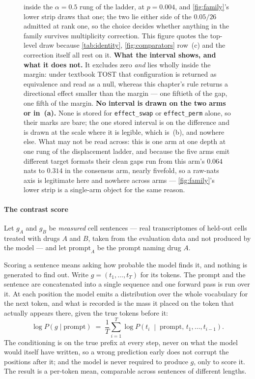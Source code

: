 \begin{figure}[htbp]
\begin{fullwidth}
{inside the $\alpha = 0.5$ rung of the ladder, at $p = 0.004$, and
\cref{fig:family}'s lower strip draws that one; the two lie either side of the
$0.05/26$ admitted at rank one, so the choice decides whether anything in the
family survives multiplicity correction. This figure quotes the top-level draw
because \cref{tab:identity}, \cref{fig:comparators} row~(c) and the correction
itself all rest on it. \textbf{What the interval shows, and what it does not.}
It excludes zero \emph{and} lies wholly inside the margin: under textbook TOST
that configuration is returned as equivalence and read as a null, whereas this
chapter's rule returns a directional effect smaller than the margin --- one
fiftieth of the gap, one fifth of the margin. \textbf{No interval is drawn on
the two arms or in~(a).} None is stored for \texttt{effect\_swap} or
\texttt{effect\_perm} alone, so their marks are bare; the one stored interval
is on the difference and is drawn at the scale where it is legible, which
is~(b), and nowhere else. What may not be read across: this is one arm at one
depth at one rung of the displacement ladder, and because the five arms emit
different target formats their clean gaps run from this arm's $0.064$ nats to
$0.314$ in the consensus arm, nearly fivefold, so a raw-nats axis is legitimate
here and nowhere across arms --- \cref{fig:family}'s lower strip is a
single-arm object for the same reason.}
\label{fig:materiality}
\end{fullwidth}
\end{figure}

\paragraph{The contrast score} Let $g_A$ and $g_B$ be \emph{measured} cell
sentences --- real transcriptomes of held-out cells treated with drugs $A$ and
$B$, taken from the evaluation data and not produced by the model --- and let
$\textrm{prompt}_A$ be the prompt naming drug $A$.

Scoring a sentence means asking how probable the model finds it, and nothing is
generated to find out. Write $g = (t_1, \ldots, t_T)$ for its tokens. The prompt
and the sentence are concatenated into a single sequence and one forward pass is
run over it. At each position the model emits a distribution over the whole
vocabulary for the next token, and what is recorded is the mass it placed on the
token that actually appears there, given the true tokens before it:
\begin{equation}
  \log P\!\left(g \mid \textrm{prompt}\right) \;=\;
  \frac{1}{T} \sum_{i=1}^{T}
  \log P\!\left(t_i \;\middle|\; \textrm{prompt},\, t_1, \ldots, t_{i-1}\right).
\end{equation}
The conditioning is on the true prefix at every step, never on what the model
would itself have written, so a wrong prediction early does not corrupt the
positions after it; and the model is never required to produce $g$, only to
score it. The result is a per-token mean, comparable across sentences of
different lengths.

